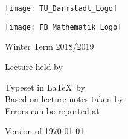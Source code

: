 \makeatletter
\begin{titlepage}
\recalctypearea
\centering

	\texttt{[image: TU\_Darmstadt\_Logo]}

\vspace{1cm}

	\texttt{[image: FB\_Mathematik\_Logo]}

\vspace{3.5cm}

	{\Huge{} \@title}

\vspace{0.5cm}

	{ Winter Term 2018/2019}

\vspace{0.5cm}

	{ Lecture held by \@lecturer}

\vspace{1.0cm}

	\begingroup
	\small
	Typeset in \LaTeX\ by \@setter\\
	Based on lecture notes taken by \@notetaker\\
	Errors can be reported at 
	\endgroup

\vfill

	{\small Version of \today}
\end{titlepage}
\makeatother
